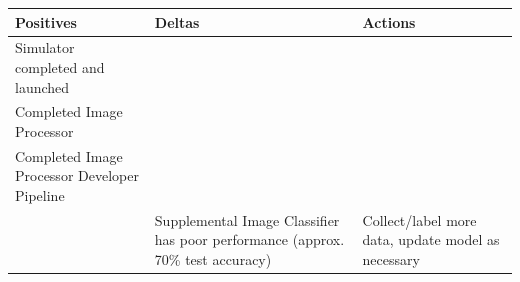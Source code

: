 \documentclass[10pt, onecolumn, draftclsnofoot, letterpaper, compsoc]{IEEEtran}
\begin{document}
\begin{table}[!h]
    \centering
    \begin{tabular}{|p{.3\linewidth}|p{.3\linewidth}|p{.3\linewidth}|}

    \cline{3-3}

    \hline \textbf{Positives} & \textbf{Deltas} & \textbf{Actions} \\ \hline

    Simulator completed and launched & & \\ \hline

	Completed Image Processor & & \\ \hline

	Completed Image Processor Developer Pipeline & & \\ \hline

	 & Supplemental Image Classifier has poor performance (approx. 70\% test accuracy) & Collect/label more data, update model as necessary \\ \hline

    \end{tabular}
\end{table}
\end{document}

